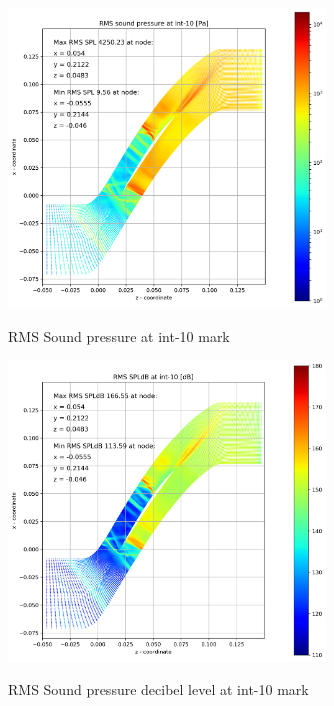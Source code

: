 \begin{figure}[ht]
  \centering
  \includegraphics[width=0.75\textwidth]{Figures/int-10-rms-spl.png} \label{int-10-rms-spl}
  \caption{RMS Sound pressure at int-10 mark}
  
  \vspace*{\floatsep}%

  \includegraphics[width=0.75\textwidth]{Figures/int-10-rms-spldb.png} \label{int-10-rms-spldb}
  \caption{RMS Sound pressure decibel level at int-10 mark}
\end{figure}
